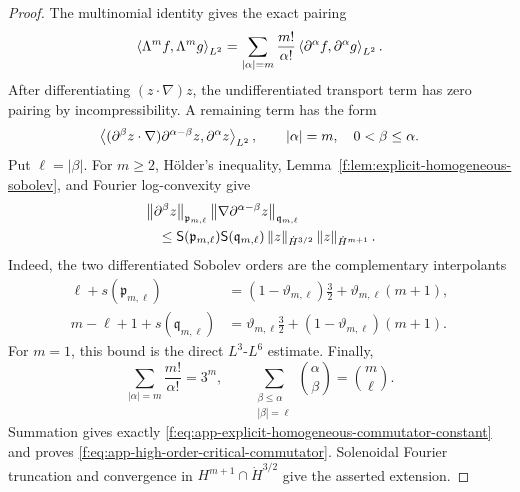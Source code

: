 \begin{proof}
The multinomial identity gives the exact pairing
\[
 \left\langle \Lambda^mf,\Lambda^mg\right\rangle_{L^2}
 =
 \sum_{|\alpha|=m}\frac{m!}{\alpha!}
 \left\langle \partial^\alpha f,\partial^\alpha g\right\rangle_{L^2}.
\]
After differentiating \((z\cdot\nabla)z\), the undifferentiated transport
term has zero pairing by incompressibility.  A remaining term has the form
\[
 \left\langle (\partial^\beta z\cdot\nabla)
          \partial^{\alpha-\beta}z,\partial^\alpha z\right\rangle_{L^2},
 \qquad
 |\alpha|=m,\quad 0<\beta\le\alpha.
\]
Put \(\ell=|\beta|\).  For \(m\ge2\), H\"older's inequality,
Lemma~\ref{f:lem:explicit-homogeneous-sobolev}, and Fourier log-convexity give
\begin{align*}
 &\left\lVert \partial^\beta z\right\rVert_{\mathfrak p_{m,\ell}}
 \left\lVert \nabla\partial^{\alpha-\beta}z\right\rVert_{\mathfrak q_{m,\ell}}\\
 &\quad\le
 \mathsf S(\mathfrak p_{m,\ell})
 \mathsf S(\mathfrak q_{m,\ell})
 \left\lVert z\right\rVert_{\dot H^{3/2}}\left\lVert z\right\rVert_{\dot H^{m+1}}.
\end{align*}
Indeed, the two differentiated Sobolev orders are the complementary
interpolants
\begin{align*}
 \ell+s(\mathfrak p_{m,\ell})
 &=(1-\vartheta_{m,\ell})\frac32
   +\vartheta_{m,\ell}(m+1),\\
 m-\ell+1+s(\mathfrak q_{m,\ell})
 &=\vartheta_{m,\ell}\frac32
   +(1-\vartheta_{m,\ell})(m+1).
\end{align*}
For \(m=1\), this bound is the direct \(L^3\)-\(L^6\) estimate.
Finally,
\[
 \sum_{|\alpha|=m}\frac{m!}{\alpha!}=3^m,
 \qquad
 \sum_{\substack{\beta\le\alpha\\|\beta|=\ell}}
 \binom\alpha\beta=\binom m\ell.
\]
Summation gives exactly
\eqref{f:eq:app-explicit-homogeneous-commutator-constant} and proves
\eqref{f:eq:app-high-order-critical-commutator}.
Solenoidal Fourier truncation and convergence in
\(H^{m+1}\cap\dot H^{3/2}\) give the asserted extension.
\end{proof}


